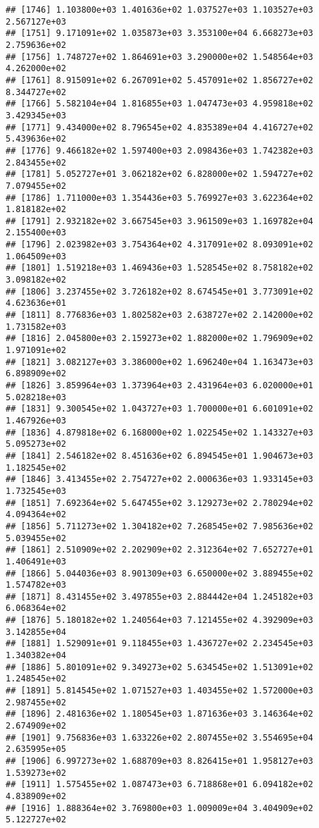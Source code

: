 \documentclass[]{article}
\begin{document}
\begin{verbatim}
## [1746] 1.103800e+03 1.401636e+02 1.037527e+03 1.103527e+03 2.567127e+03
## [1751] 9.171091e+02 1.035873e+03 3.353100e+04 6.668273e+03 2.759636e+02
## [1756] 1.748727e+02 1.864691e+03 3.290000e+02 1.548564e+03 4.262000e+02
## [1761] 8.915091e+02 6.267091e+02 5.457091e+02 1.856727e+02 8.344727e+02
## [1766] 5.582104e+04 1.816855e+03 1.047473e+03 4.959818e+02 3.429345e+03
## [1771] 9.434000e+02 8.796545e+02 4.835389e+04 4.416727e+02 5.439636e+02
## [1776] 9.466182e+02 1.597400e+03 2.098436e+03 1.742382e+03 2.843455e+02
## [1781] 5.052727e+01 3.062182e+02 6.828000e+02 1.594727e+02 7.079455e+02
## [1786] 1.711000e+03 1.354436e+03 5.769927e+03 3.622364e+02 1.818182e+02
## [1791] 2.932182e+02 3.667545e+03 3.961509e+03 1.169782e+04 2.155400e+03
## [1796] 2.023982e+03 3.754364e+02 4.317091e+02 8.093091e+02 1.064509e+03
## [1801] 1.519218e+03 1.469436e+03 1.528545e+02 8.758182e+02 3.098182e+02
## [1806] 3.237455e+02 3.726182e+02 8.674545e+01 3.773091e+02 4.623636e+01
## [1811] 8.776836e+03 1.802582e+03 2.638727e+02 2.142000e+02 1.731582e+03
## [1816] 2.045800e+03 2.159273e+02 1.882000e+02 1.796909e+02 1.971091e+02
## [1821] 3.082127e+03 3.386000e+02 1.696240e+04 1.163473e+03 6.898909e+02
## [1826] 3.859964e+03 1.373964e+03 2.431964e+03 6.020000e+01 5.028218e+03
## [1831] 9.300545e+02 1.043727e+03 1.700000e+01 6.601091e+02 1.467926e+03
## [1836] 4.879818e+02 6.168000e+02 1.022545e+02 1.143327e+03 5.095273e+02
## [1841] 2.546182e+02 8.451636e+02 6.894545e+01 1.904673e+03 1.182545e+02
## [1846] 3.413455e+02 2.754727e+02 2.000636e+03 1.933145e+03 1.732545e+03
## [1851] 7.692364e+02 5.647455e+02 3.129273e+02 2.780294e+02 4.094364e+02
## [1856] 5.711273e+02 1.304182e+02 7.268545e+02 7.985636e+02 5.039455e+02
## [1861] 2.510909e+02 2.202909e+02 2.312364e+02 7.652727e+01 1.406491e+03
## [1866] 5.044036e+03 8.901309e+03 6.650000e+02 3.889455e+02 1.574782e+03
## [1871] 8.431455e+02 3.497855e+03 2.884442e+04 1.245182e+03 6.068364e+02
## [1876] 5.180182e+02 1.240564e+03 7.121455e+02 4.392909e+03 3.142855e+04
## [1881] 1.529091e+01 9.118455e+03 1.436727e+02 2.234545e+03 1.340382e+04
## [1886] 5.801091e+02 9.349273e+02 5.634545e+02 1.513091e+02 1.248545e+02
## [1891] 5.814545e+02 1.071527e+03 1.403455e+02 1.572000e+03 2.987455e+02
## [1896] 2.481636e+02 1.180545e+03 1.871636e+03 3.146364e+02 2.674909e+02
## [1901] 9.756836e+03 1.633226e+02 2.807455e+02 3.554695e+04 2.635995e+05
## [1906] 6.997273e+02 1.688709e+03 8.826415e+01 1.958127e+03 1.539273e+02
## [1911] 1.575455e+02 1.087473e+03 6.718868e+01 6.094182e+02 4.838909e+02
## [1916] 1.888364e+02 3.769800e+03 1.009009e+04 3.404909e+02 5.122727e+02

\end{verbatim}
\end{document}
